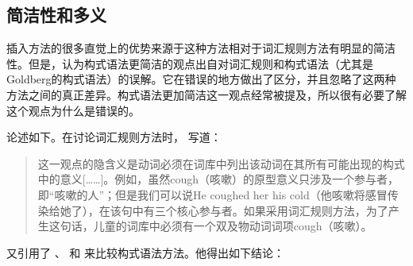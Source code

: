 \subsection{简洁性和多义}
\label{polysemy-subsec}

    插入方法的很多直觉上的优势来源于这种方法相对于词汇规则方法有明显的简洁性。但是，认为构式语法更简洁的观点出自对词汇规则和构式语法（尤其是Goldberg\citeyearpar{Goldberg95a,Goldberg2006a}的构式语法）的误解。它在错误的地方做出了区分，并且忽略了这两种方法之间的真正差异。构式语法更加简洁这一观点经常被提及，所以很有必要了解这个观点为什么是错误的。

     \citet{Tomasello2003a}论述如下。在讨论词汇规则方法时， \citet[]{Tomasello2003a}写道：   

\begin{quotation}
这一观点的隐含义是动词必须在词库中列出该动词在其所有可能出现的构式中的意义[……]。例如，虽然cough（咳嗽）的原型意义只涉及一个参与者，即“咳嗽的人”；但是我们可以说He coughed her his cold（他咳嗽将感冒传染给她了），在该句中有三个核心参与者。如果采用词汇规则方法，为了产生这句话，儿童的词库中必须有一个双及物动词词项cough（咳嗽）。\citep[]{Tomasello2003a}
\end{quotation}
 \citet[]{Tomasello2003a}又引用了 \citet{FKoC88a}、 \citet{Goldberg95a}和 \citet{Croft2001a}来比较构式语法方法。他得出如下结论：

